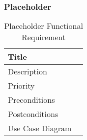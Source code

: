 \subsubsection{Placeholder}
  \begin{table}[h!]
    \caption{Placeholder Functional Requirement}
    \label{evolutionary-requirements/functional-requirements/placeholder}
    \begin{tabularx}{\textwidth}{|l|X|}
      \hline
      Title            & \\ \hline
      Description      & \\ \hline
      Priority         & \\ \hline
      Preconditions    & \\ \hline
      Postconditions   & \\ \hline
      Use Case Diagram & \\ \hline
    \end{tabularx}
  \end{table}
